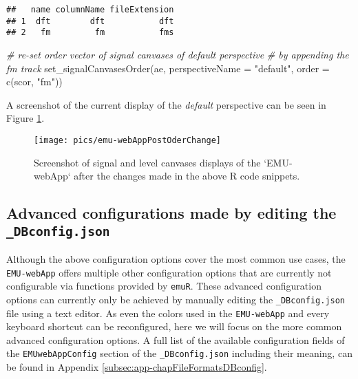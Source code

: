 \documentclass[
]{book}
\newenvironment{Shaded}{\begin{snugshade}}{\end{snugshade}}
\newcommand{\AttributeTok}[1]{\textcolor[rgb]{0.77,0.63,0.00}{#1}}
\newcommand{\CommentTok}[1]{\textcolor[rgb]{0.56,0.35,0.01}{\textit{#1}}}
\newcommand{\FunctionTok}[1]{\textcolor[rgb]{0.00,0.00,0.00}{#1}}
\newcommand{\NormalTok}[1]{#1}
\newcommand{\StringTok}[1]{\textcolor[rgb]{0.31,0.60,0.02}{#1}}
\begin{document}
\begin{verbatim}
##   name columnName fileExtension
## 1  dft        dft           dft
## 2   fm         fm           fms
\end{verbatim}

\begin{Shaded}
\begin{Highlighting}[]
\CommentTok{\# re{-}set order vector of signal canvases of default perspective}
\CommentTok{\# by appending the fm track}
\FunctionTok{set\_signalCanvasesOrder}\NormalTok{(ae,}
                        \AttributeTok{perspectiveName =} \StringTok{"default"}\NormalTok{,}
                        \AttributeTok{order =} \FunctionTok{c}\NormalTok{(scor, }\StringTok{"fm"}\NormalTok{))}
\end{Highlighting}
\end{Shaded}

A screenshot of the current display of the \emph{default} perspective can be seen in Figure \ref{fig:webApp-postOderChange}.

\begin{figure}

{\centering \texttt{[image: pics/emu-webAppPostOderChange]} 

}

\caption{Screenshot of signal and level canvases displays of the `EMU-webApp` after the changes made in the above R code snippets.}\label{fig:webApp-postOderChange}
\end{figure}

\hypertarget{subsec:emu-webAppAdvancedConfig}{%
\subsection{\texorpdfstring{Advanced configurations made by editing the \texttt{\_DBconfig.json}}{Advanced configurations made by editing the \_DBconfig.json}}\label{subsec:emu-webAppAdvancedConfig}}

Although the above configuration options cover the most common use cases, the \texttt{EMU-webApp} offers multiple other configuration options that are currently not configurable via functions provided by \texttt{emuR}. These advanced configuration options can currently only be achieved by manually editing the \texttt{\_DBconfig.json} file using a text editor. As even the colors used in the \texttt{EMU-webApp} and every keyboard shortcut can be reconfigured, here we will focus on the more common advanced configuration options. A full list of the available configuration fields of the \texttt{EMUwebAppConfig} section of the \texttt{\_DBconfig.json} including their meaning, can be found in Appendix \ref{subsec:app-chapFileFormatsDBconfig}.
\end{document}
